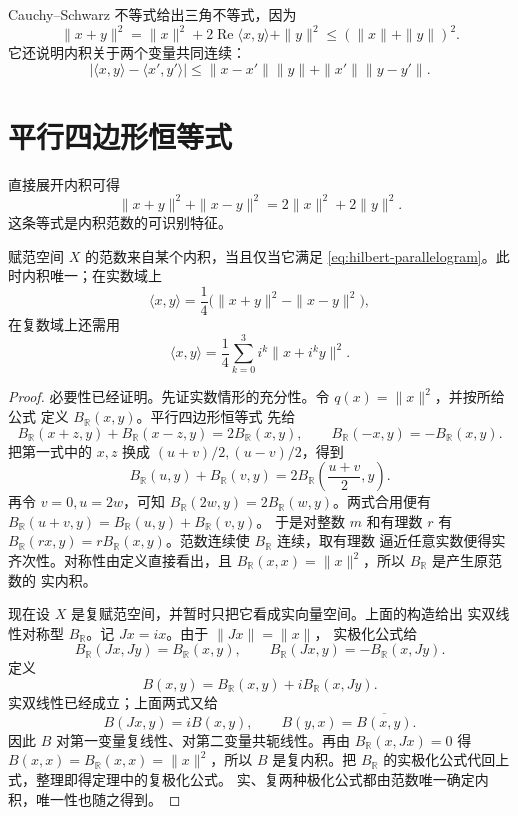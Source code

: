 Cauchy--Schwarz 不等式给出三角不等式，因为
\[
 \|x+y\|^2=\|x\|^2+2\operatorname{Re}\langle x,y\rangle+\|y\|^2
 \le(\|x\|+\|y\|)^2.
\]
它还说明内积关于两个变量共同连续：
\[
 |\langle x,y\rangle-\langle x',y'\rangle|
 \le\|x-x'\|\|y\|+\|x'\|\|y-y'\|.
\]

\section{平行四边形恒等式}

直接展开内积可得
\begin{equation}\label{eq:hilbert-parallelogram}
 \|x+y\|^2+\|x-y\|^2=2\|x\|^2+2\|y\|^2.
\end{equation}
这条等式是内积范数的可识别特征。

\begin{theorem}\label{thm:jordan-von-neumann}
赋范空间 \(X\) 的范数来自某个内积，当且仅当它满足
\eqref{eq:hilbert-parallelogram}。此时内积唯一；在实数域上
\[
 \langle x,y\rangle=\frac14\bigl(\|x+y\|^2-\|x-y\|^2\bigr),
\]
在复数域上还需用
\[
 \langle x,y\rangle=\frac14\sum_{k=0}^3 i^k\|x+i^ky\|^2.
\]
\end{theorem}
\begin{proof}
必要性已经证明。先证实数情形的充分性。令 \(q(x)=\|x\|^2\)，并按所给公式
定义 \(B_{\mathbb R}(x,y)\)。平行四边形恒等式
先给
\[
 B_{\mathbb R}(x+z,y)+B_{\mathbb R}(x-z,y)=2B_{\mathbb R}(x,y),
 \qquad B_{\mathbb R}(-x,y)=-B_{\mathbb R}(x,y).
\]
把第一式中的 \(x,z\) 换成 \((u+v)/2,(u-v)/2\)，得到
\[
 B_{\mathbb R}(u,y)+B_{\mathbb R}(v,y)
 =2B_{\mathbb R}\!\left(\frac{u+v}{2},y\right).
\]
再令 \(v=0,u=2w\)，可知
\(B_{\mathbb R}(2w,y)=2B_{\mathbb R}(w,y)\)。两式合用便有
\(B_{\mathbb R}(u+v,y)=B_{\mathbb R}(u,y)+B_{\mathbb R}(v,y)\)。
于是对整数 \(m\) 和有理数 \(r\) 有
\(B_{\mathbb R}(rx,y)=rB_{\mathbb R}(x,y)\)。范数连续使
\(B_{\mathbb R}\) 连续，取有理数
逼近任意实数便得实齐次性。对称性由定义直接看出，且
\(B_{\mathbb R}(x,x)=\|x\|^2\)，所以 \(B_{\mathbb R}\) 是产生原范数的
实内积。

现在设 \(X\) 是复赋范空间，并暂时只把它看成实向量空间。上面的构造给出
实双线性对称型 \(B_{\mathbb R}\)。记 \(Jx=ix\)。由于 \(\|Jx\|=\|x\|\)，
实极化公式给
\[
 B_{\mathbb R}(Jx,Jy)=B_{\mathbb R}(x,y),\qquad
 B_{\mathbb R}(Jx,y)=-B_{\mathbb R}(x,Jy).
\]
定义
\[
 B(x,y)=B_{\mathbb R}(x,y)+iB_{\mathbb R}(x,Jy).
\]
实双线性已经成立；上面两式又给
\[
 B(Jx,y)=iB(x,y),\qquad B(y,x)=\overline{B(x,y)}.
\]
因此 \(B\) 对第一变量复线性、对第二变量共轭线性。再由
\(B_{\mathbb R}(x,Jx)=0\) 得
\(B(x,x)=B_{\mathbb R}(x,x)=\|x\|^2\)，所以 \(B\) 是复内积。把
\(B_{\mathbb R}\) 的实极化公式代回上式，整理即得定理中的复极化公式。
实、复两种极化公式都由范数唯一确定内积，唯一性也随之得到。
\end{proof}

